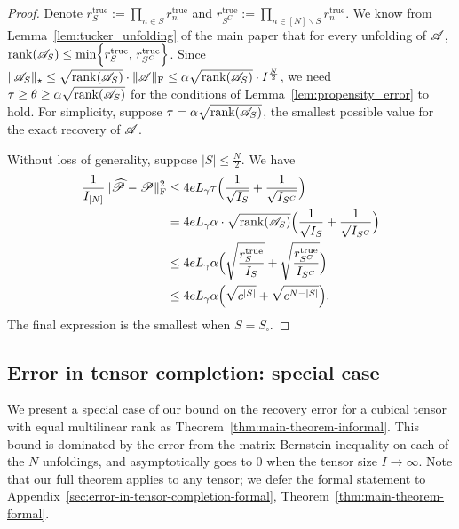 \documentclass{article}
\newcommand{\T}[2][]{#1\mathscr{\MakeUppercase{#2}}}
\newcommand{\norm}[1]{\Vert #1 \Vert}
\newcommand{\fnorm}[1]{\norm{#1}_{\mathrm{F}}}
\newcommand{\nucnorm}[1]{\norm{#1}_\star}
\newcommand{\rank}[1]{\mathrm{rank}({#1})}
\theoremstyle{plain}
\begin{document}
\begin{proof}
	Denote $r_S^\mathrm{true} := \prod_{n \in S} r_n^\mathrm{true}$ and $r_{S^C}^\mathrm{true} := \prod_{n \in [N] \backslash S} r_n^\mathrm{true}$. 
	We know from Lemma~\ref{lem:tucker_unfolding} of the main paper that for every unfolding of $\T{A}$, $\rank{\T{A}_S} \leq \min \Bigl\{r_S^\mathrm{true}, \, r_{S^C}^\mathrm{true} \Big\}$. 
	Since $\nucnorm{\T{A}_S} \leq \sqrt{\rank{\T{A}_S}} \cdot \fnorm{\T{A}} \leq \alpha \sqrt{\rank{\T{A}_S}} \cdot I^\frac{N}{2}$, we need $\tau \geq \theta \geq \alpha \sqrt{\rank{\T{A}_S}}$ for the conditions of Lemma~\ref{lem:propensity_error} to hold.
	For simplicity, suppose $\tau = \alpha \sqrt{\rank{\T{A}_S}}$, the smallest possible value for the exact recovery of $\T{A}$.
	
	Without loss of generality, suppose $|S| \leq \frac{N}{2}$.
	We have
	\begin{equation}
		\begin{aligned}
			\frac{1}{I_{[N]}} \fnorm{\widehat{\T{P}} - \T{P}}^2 & \leq 4 e L_\gamma \tau \Big(\frac{1}{\sqrt{I_S}}+\frac{1}{\sqrt{I_{S^C}}}\Big) \\
			& = 4 e L_\gamma \alpha \cdot \sqrt{\rank{\T{A}_S}} \Big(\frac{1}{\sqrt{I_S}}+\frac{1}{\sqrt{I_{S^C}}}\Big) \\
			& \leq 4 e L_\gamma \alpha \Big(\sqrt{\frac{r_S^\mathrm{true}}{I_S}}+\sqrt{\frac{r_{S^C}^\mathrm{true}}{I_{S^C}}}\Big) \\
			& \leq 4 e L_\gamma \alpha \Big(\sqrt{c^{|S|}}+ \sqrt{c^{N - |S|}}\Big).
		\end{aligned}
		\nonumber
	\end{equation}
	The final expression is the smallest when $S = S_\square$.
\end{proof}

\subsection{Error in tensor completion: special case}
\label{sec:error-in-tensor-completion-informal}
We present a special case of our bound on the recovery error for a cubical tensor with equal multilinear rank as Theorem~\ref{thm:main-theorem-informal}.
This bound is dominated by the error from the matrix Bernstein inequality \cite{tropp2015introduction} on each of the $N$ unfoldings, and asymptotically goes to 0 when the tensor size $I \rightarrow \infty$. 
Note that our full theorem applies to any tensor; we defer the formal statement to Appendix~\ref{sec:error-in-tensor-completion-formal}, Theorem~\ref{thm:main-theorem-formal}. 
\end{document}
